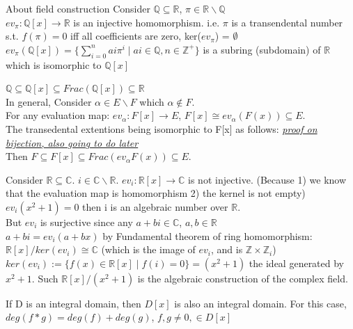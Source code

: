 \documentclass{article}
\newcommand\R{\ensuremath{\mathbb{R}}}
\newcommand\Z{\ensuremath{\mathbb{Z}}}
\newcommand\Q{\ensuremath{\mathbb{Q}}}
\newcommand\C{\ensuremath{\mathbb{C}}}
\begin{document}
\begin{Example}
About field construction
    Consider $\Q \subseteq \R$, $\pi \in \R  \backslash \Q$ 
    \\ $ev_\pi: \Q[x] \rightarrow \R$ is an injective homomorphism. 
    i.e. $\pi$ is a transendental number s.t. $f(\pi) = 0$ iff all coefficients are zero, ker($ev_\pi$) = $\emptyset$
    \\ $ev_\pi(\Q[x]) = \{ \sum_{i=0}^n ai \pi^i \mid ai \in \Q, n\in \Z^+\}$ is a subring (subdomain) of $\R$ which is isomorphic to $\Q[x]$
\end{Example}
\begin{note}
    $\Q \subseteq \Q[x] \subseteq Frac(\Q[x]) \subseteq \R$
\\ In general, Consider $\alpha \in E\backslash F$ which $\alpha \notin F$.
\\For any evaluation map: $ev_\alpha: F[x] \rightarrow E$, $F[x] \cong ev_\alpha(F(x))\subseteq E$.
\\ The transedental extentions being isomorphic to F[x] as follows:
\textit{\href{https://math.stackexchange.com/questions/1337221/transcendental-extensions-f-alpha-isomorphic-to-fx}{proof on bijection, also going to do later}}
\\ Then $F \subseteq F[x] \subseteq Frac(ev_\alpha F(x)) \subseteq E$.
\end{note}
\begin{Example}
    Consider $\R \subseteq \C$. $i \in \C \backslash \R$.
    $ev_i: \R[x] \rightarrow \C$ is not injective. (Because 1) we know that the evaluation map is homomorphism 2) the kernel is not empty)
    $ev_i(x^2+1) = 0$ then i is an algebraic number over $\R$.
    \\But $ev_i$ is surjective since any $a+bi \in \C $, $a,b \in \R$
    \\ $a + bi = ev_i(a+bx)$ by Fundamental theorem of ring homomorphism:
    $\R[x] / ker(ev_i) \cong \C$ (which is the image of $ev_i$, and is $\Z \times \Z_i$)
    \\$ker(ev_i):= \{f(x)\in \R[x] \mid f(i) = 0\} = (x^2+1)$ the ideal generated by $x^2+1$. Such $\R[x]/(x^2+1)$ is the algebraic construction of the complex field.  
\end{Example}


\begin{theorem}
    If D is an integral domain, then $D[x]$ is also an integral domain. For this case, $deg(f*g) = deg(f) + deg(g)$, $f,g\neq 0, \in D[x]$
\end{theorem}
\end{document}
